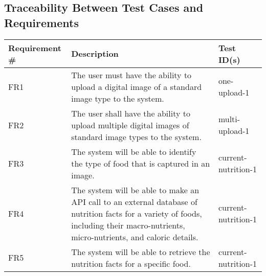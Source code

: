 \documentclass[12pt, titlepage]{article}
\begin{document}
	\subsection{Traceability Between Test Cases and Requirements}
	
	\begin{table}[H]
	
	\begin{tabular}{|p{3.5cm}|p{6.5cm}|p{4.5cm}|}

	\hline
	\textbf{Requirement \#} & \textbf{Description}                                                                                                                                                                  & \textbf{Test ID(s)}                                                                                          \\ \hline
	FR1                     & The user must have the ability to upload a digital image of a standard image type to the system.                                                                                      & one-upload-1                                                                                                 \\ \hline
	FR2                     & The user shall have the ability to upload multiple digital images of standard image types to the system.                                                                              & multi-upload-1                                                                                               \\ \hline
	FR3                     & The system will be able to identify the type of food that is captured in an image.                                                                                                    & current-nutrition-1                                                                                          \\ \hline
	FR4                     & The system will be able to make an API call to an external database of nutrition facts for a variety of foods, including their macro-nutrients, micro-nutrients, and caloric details. & current-nutrition-1                                                                                          \\ \hline
	FR5                     & The system will be able to retrieve the nutrition facts for a specific food.                                                                                                          & current-nutrition-1                                                                                          \\ \hline

\end{tabular}
\end{table}
\end{document}

